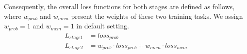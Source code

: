 Consequently, the overall loss functions for both stages are defined as follows, where $w_{prob}$ and $w_{mcm}$ present the weights of these two training tasks. We assign $w_{prob}=1$ and $w_{mcm}=1$ in default setting. 
\begin{equation}
    \begin{split}
        L_{stage1} & = loss_{prob} \\
        L_{stage2} & = w_{prob} \cdot loss_{prob} + w_{mcm} \cdot loss_{mcm} \\
    \end{split}
\end{equation}